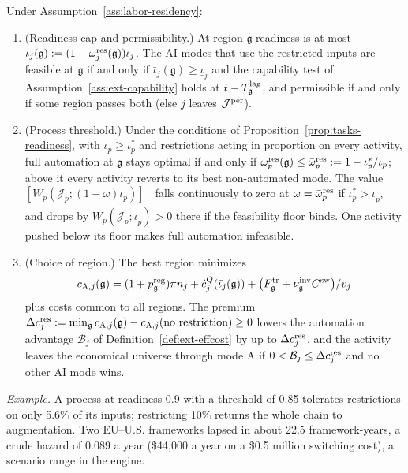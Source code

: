 \begin{proposition}\label{prop:labor-residency}
Under Assumption~\ref{ass:labor-residency}:
\begin{enumerate}
\item[(a)] (Readiness cap and permissibility.) At region $\mathfrak g$ readiness is at most $\bar\iota_j(\mathfrak g):=(1-\omega^{\rm res}_j(\mathfrak g))\iota_j$. The AI modes that use the restricted inputs are feasible at $\mathfrak g$ if and only if $\bar\iota_j(\mathfrak g)\ge\underline\iota_j$ and the capability test of Assumption~\ref{ass:ext-capability} holds at $t-T^{\rm lag}_{\mathfrak g}$, and permissible if and only if some region passes both (else $j$ leaves $\mathcal J^{\rm per}$).
\item[(b)] (Process threshold.) Under the conditions of Proposition~\ref{prop:tasks-readiness}, with $\iota_p\ge\iota^*_p$ and restrictions acting in proportion on every activity, full automation at $\mathfrak g$ stays optimal if and only if $\omega^{\rm res}_p(\mathfrak g)\le\bar\omega^{\rm res}_p:=1-\iota^*_p/\iota_p$; above it every activity reverts to its best non-automated mode. The value $[W_p(\mathcal J_p;(1-\omega)\iota_p)]_+$ falls continuously to zero at $\omega=\bar\omega^{\rm res}_p$ if $\iota^*_p>\underline\iota_p$, and drops by $W_p(\mathcal J_p;\underline\iota_p)>0$ there if the feasibility floor binds. One activity pushed below its floor makes full automation infeasible.
\item[(c)] (Choice of region.) The best region minimizes
\begin{equation}\label{eq:labor-region}
c_{\mathrm A,j}(\mathfrak g)=(1+p^{\rm reg}_{\mathfrak g})\pi n_j+\hat c^Q_j(\bar\iota_j(\mathfrak g))+\bigl(F^{\rm tr}_{\mathfrak g}+\nu^{\rm inv}_{\mathfrak g}C^{\rm sw}\bigr)/v_j
\end{equation}
plus costs common to all regions. The premium $\Delta c^{\rm res}_j:=\min_{\mathfrak g}c_{\mathrm A,j}(\mathfrak g)-c_{\mathrm A,j}(\text{no restriction})\ge0$ lowers the automation advantage $\mathcal B_j$ of Definition~\ref{def:ext-effcost} by up to $\Delta c^{\rm res}_j$, and the activity leaves the economical universe through mode A if $0<\mathcal B_j\le\Delta c^{\rm res}_j$ and no other AI mode wins.
\end{enumerate}
\end{proposition}

\noindent\emph{Example.} A process at readiness 0.9 with a threshold of 0.85 tolerates restrictions on only 5.6\% of its inputs; restricting 10\% returns the whole chain to augmentation. Two EU--U.S. frameworks lapsed in about 22.5 framework-years, a crude hazard of 0.089 a year (\$44{,}000 a year on a \$0.5 million switching cost), a scenario range in the engine.

